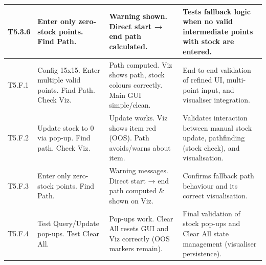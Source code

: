 \begin{longtable}{|p{}|p{}|p{}|p{}|}
	\hline
	T5.3.6 & Enter only zero-stock points. Find Path. & Warning shown. Direct start → end path calculated. & Tests fallback logic when no valid intermediate points with stock are entered. \\
	\hline
	T5.F.1 & Config 15x15. Enter multiple valid points. Find Path. Check Viz. & Path computed. Viz shows path, stock colours correctly. Main GUI simple/clean. & End-to-end validation of refined UI, multi-point input, and visualiser integration. \\
	\hline
	T5.F.2 & Update stock to 0 via pop-up. Find path. Check Viz. & Update works. Viz shows item red (OOS). Path avoids/warns about item. & Validates interaction between manual stock update, pathfinding (stock check), and visualisation. \\
	\hline
	T5.F.3 & Enter only zero-stock points. Find Path. & Warning messages. Direct start → end path computed \& shown on Viz. & Confirms fallback path behaviour and its correct visualisation. \\
	\hline
	T5.F.4 & Test Query/Update pop-ups. Test Clear All. & Pop-ups work. Clear All resets GUI and Viz correctly (OOS markers remain). & Final validation of stock pop-ups and Clear All state management (visualiser persistence). \\
	\hline
\end{longtable}


